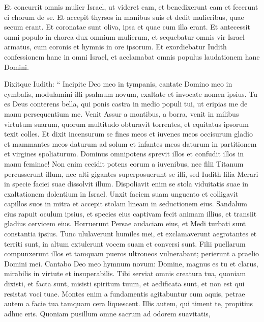 \begin{biblechapter}
\begin{biblechapter}
\begin{biblechapter}
\begin{biblechapter}
\begin{biblechapter}
\begin{biblechapter}
\begin{biblechapter}
\begin{biblechapter}
\begin{biblechapter}
\begin{biblechapter}
\begin{biblechapter}
\begin{biblechapter}
\begin{biblechapter}
\begin{biblechapter}
\begin{biblechapter}
\verse Et concurrit omnis mulier Israel, ut videret eam, et benedixerunt eam et fecerunt ei chorum de se. Et accepit thyrsos in manibus suis et dedit mulieribus, quae secum erant. 
\verse Et coronatae sunt oliva, ipsa et quae cum illa erant. Et antecessit omni populo in chorea dux omnium mulierum, et sequebatur omnis vir Israel armatus, cum coronis et hymnis in ore ipsorum. 
 \verse Et exordiebatur Iudith confessionem hanc in omni Israel, et acclamabat omnis populus laudationem hanc Domini.
 
\begin{biblechapter}
\verse Dixitque Iudith:
 “ Incipite Deo meo in tympanis,
 cantate Domino meo in cymbalis,
 modulamini illi psalmum novum,
 exaltate et invocate nomen ipsius.
 \verse Tu es Deus conterens bella,
 qui ponis castra in medio populi tui, ut eripias me de manu persequentium me.
 \verse Venit Assur a montibus, a borra,
 venit in milibus virtutum suarum, quorum multitudo obturavit torrentes,
 et equitatus ipsorum texit colles.
 \verse Et dixit incensurum se fines meos
 et iuvenes meos occisurum gladio
 et mammantes meos daturum ad solum
 et infantes meos daturum in partitionem
 et virgines spoliaturum.
 \verse Dominus omnipotens sprevit illos et confudit illos in manu feminae! 
\verse Non enim cecidit potens eorum a iuvenibus,
 nec filii Titanum percusserunt illum,
 nec alti gigantes superposuerunt se illi,
 sed Iudith filia Merari
 in specie faciei suae dissolvit illum. 
\verse Dispoliavit enim se stola viduitatis suae
 in exaltationem dolentium in Israel. Unxit faciem suam unguento
 \verse et colligavit capillos suos in mitra
 et accepit stolam lineam in seductionem eius.
 \verse Sandalum eius rapuit oculum ipsius,
 et species eius captivam fecit animam illius,
 et transiit gladius cervicem eius.
 \verse Horruerunt Persae audaciam eius,
 et Medi turbati sunt constantia ipsius.
 \verse Tunc ululaverunt humiles mei,
 et exclamaverunt aegrotantes et territi sunt,
 in altum extulerunt vocem suam
 et conversi sunt.
 \verse Filii puellarum compunxerunt illos
 et tamquam pueros ultroneos vulnerabant;
 perierunt a praelio Domini mei.
 \verse Cantabo Deo meo hymnum novum:
 Domine, magnus es tu et clarus,
 mirabilis in virtute et insuperabilis. 
\verse Tibi serviat omnis creatura tua,
 quoniam dixisti, et facta sunt,
 misisti spiritum tuum, et aedificata sunt,
 et non est qui resistat voci tuae.
 \verse Montes enim a fundamentis agitabuntur cum aquis,
 petrae autem a facie tua tamquam cera liquescent.
 Illis autem, qui timent te,
 propitius adhuc eris.
 \verse Quoniam pusillum omne sacrum ad odorem suavitatis,

\end{biblechapter}
\end{biblechapter}
\end{biblechapter}
\end{biblechapter}
\end{biblechapter}
\end{biblechapter}
\end{biblechapter}
\end{biblechapter}
\end{biblechapter}
\end{biblechapter}
\end{biblechapter}
\end{biblechapter}
\end{biblechapter}
\end{biblechapter}
\end{biblechapter}
\end{biblechapter}
